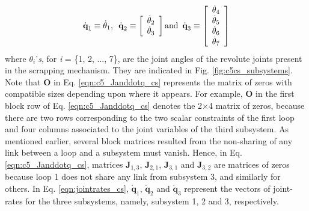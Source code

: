 {\begin{equation}
	\dot{\textbf{q}}_1 \equiv \textit{$\dot\theta_1$}, \hspace*{5pt} \dot{\textbf{q}}_2 \equiv 
	\left[ \begin{array}{c}
	\textit{$\dot\theta_2$} \\
	\textit{$\dot\theta_3$} \\ 
	\end{array} \right] \mathrm{and} \hspace*{5pt}
	\dot{\textbf{q}}_3 \equiv 
	\left[ \begin{array}{c}
	\textit{$\dot\theta_4$} \\
	\textit{$\dot\theta_5$} \\ 
	\textit{$\dot\theta_6$} \\
	\textit{$\dot\theta_7$} \\ 
	\end{array} \right]
	\end{equation} 
where $\theta_i$'\emph{s}, for \emph{i} = \{1, 2, ..., 7\}, are the joint angles of the revolute joints present in the scrapping mechanism. They are indicated in Fig. \ref{fig:c5cs_subsystems}. Note that \textbf{O} in Eq. \ref{eqn:c5_Janddotq_cs} represents the matrix of zeros with compatible sizes depending upon where it appears. For example, \textbf{O} in the first block row of Eq. \ref{eqn:c5_Janddotq_cs} denotes the 2$\times$4 matrix of zeros, because there are two rows corresponding to the two scalar constraints of the first loop and four columns associated to the joint variables of the third subsystem. As mentioned earlier, several block matrices resulted from the non-sharing of any link between a loop and a subsystem must vanish. Hence, in Eq. \ref{eqn:c5_Janddotq_cs}, matrices \textbf{J$_{1,3}$}, \textbf{J$_{2,1}$}, \textbf{J$_{3,1}$} and \textbf{J$_{3,2}$} are matrices of zeros because loop 1 does not share any link from subsystem 3, and similarly for others. In Eq. \ref{eqn:jointrates_cs}, \textbf{$\dot{\textbf{q}}_1$}, \textbf{$\dot{\textbf{q}}_2$} and \textbf{$\dot{\textbf{q}}_3$} represent the vectors of joint-rates for the three subsystems, namely, subsystem 1, 2 and 3, respectively.
	\begin{figure}[t]
		\begin{center}
 			 \hspace{5pt}
			\hspace{5pt}

\end{center}
\end{figure}}
